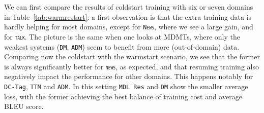 \documentclass[11pt,a4paper]{article}
\newcommand{\fyTodo}[1]{\Todo[FY:]{\textcolor{orange}{#1}}}
\newcommand{\fyDone}[1]{\done[FY]\Todo[FY:]{\textcolor{orange}{#1}}}
\newcommand{\revision}[1]{#1}
\newcommand{\domain}[1]{\texttt{\textsc{#1}}}
\newcommand{\system}[1]{\texttt{{#1}}}
\begin{document}
We can first compare the results of coldstart training with six or seven domains in Table~\ref{tab:warmrestart}: a first observation is that the extra training data \revision{is hardly helping} for most domains, except for \domain{News}, where we see a large gain, and for \domain{talk}. The picture is the same when one looks at MDMTs, where only the weakest systems (\system{DM}, \system{ADM}) seem to benefit from more (out-of-domain) data.\fyDone{is this significant ?}
Comparing now the coldstart with the warmstart scenario, we see that the former is always significantly better for \domain{news}, as expected, and that resuming training also negatively impact the performance for other domains. This happens notably for \system{DC-Tag}, \system{TTM} and \system{ADM}. In this setting \system{MDL Res} and \system{DM} show the smaller average loss, with the former achieving the best balance of training cost and average BLEU score.%
\fyDone{Numbers for MDL Res need significancy testing; and they are weird - why do we see this ? Because the generic is bad ?}
\end{document}
